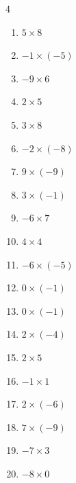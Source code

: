 \begin{multicols}{4}
\begin{enumerate}
  \item $5\times 8$
        \phantom{$=40$}

  \item $-1\times (-5)$
        \phantom{$=5$}

  \item $-9\times 6$
        \phantom{$=-54$}

  \item $2\times 5$
        \phantom{$=10$}

  \item $3\times 8$
        \phantom{$=24$}

  \item $-2\times (-8)$
        \phantom{$=16$}

  \item $9\times (-9)$
        \phantom{$=-81$}

  \item $3\times (-1)$
        \phantom{$=-3$}

  \item $-6\times 7$
        \phantom{$=-42$}

  \item $4\times 4$
        \phantom{$=16$}

  \item $-6\times (-5)$
        \phantom{$=30$}

  \item $0\times (-1)$
        \phantom{$=0$}

\columnbreak %

  \item $0\times (-1)$
        \phantom{$=0$}

  \item $2\times (-4)$
        \phantom{$=-8$}

  \item $2\times 5$
        \phantom{$=10$}

  \item $-1\times 1$
        \phantom{$=-1$}

  \item $2\times (-6)$
        \phantom{$=-12$}

  \item $7\times (-9)$
        \phantom{$=-63$}

  \item $-7\times 3$
        \phantom{$=-21$}

  \item $-8\times 0$
        \phantom{$=0$}


\end{enumerate}
\end{multicols}
